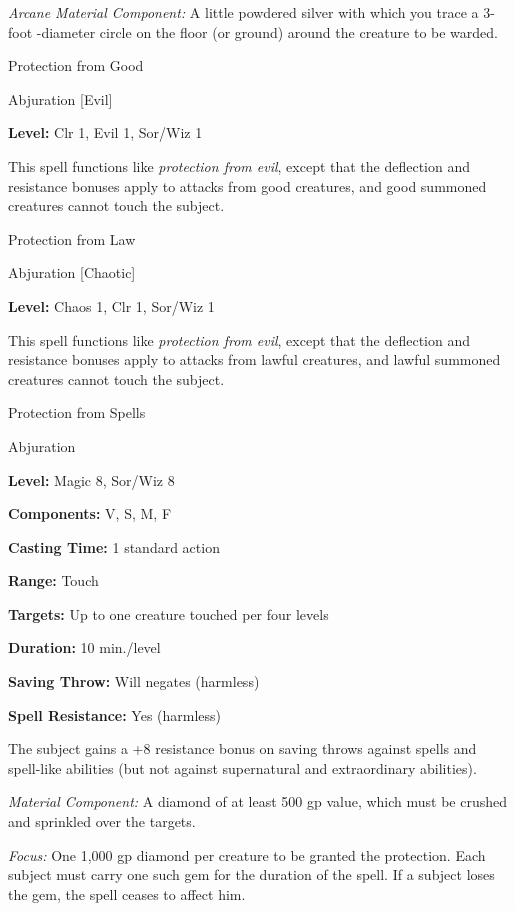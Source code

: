 \documentclass{article}
\begin{document}
\textit{Arcane Material Component: }A little powdered silver with which you trace 
a 3-foot -diameter circle on the floor (or ground) around the creature to be warded.

\vspace{12pt}
Protection from Good

Abjuration [Evil]

\textbf{Level:} Clr 1, Evil 1, Sor/Wiz 1

This spell functions like \textit{protection from evil}, except that the deflection 
and resistance bonuses apply to attacks from good creatures, and good summoned 
creatures cannot touch the subject.

\vspace{12pt}
Protection from Law

Abjuration [Chaotic]

\textbf{Level:} Chaos 1, Clr 1, Sor/Wiz 1

This spell functions like \textit{protection from evil}, except that the deflection 
and resistance bonuses apply to attacks from lawful creatures, and lawful summoned 
creatures cannot touch the subject.

\vspace{12pt}
Protection from Spells

Abjuration

\textbf{Level: }Magic 8, Sor/Wiz 8

\textbf{Components:} V, S, M, F

\textbf{Casting Time:} 1 standard action

\textbf{Range:} Touch

\textbf{Targets:} Up to one creature touched per four levels

\textbf{Duration:} 10 min./level

\textbf{Saving Throw: }Will negates (harmless)

\textbf{Spell Resistance:} Yes (harmless)

The subject gains a +8 resistance bonus on saving throws against spells and spell-like 
abilities (but not against supernatural and extraordinary abilities).

\textit{Material Component: }A diamond of at least 500 gp value, which must be 
crushed and sprinkled over the targets.

\textit{Focus: }One 1,000 gp diamond per creature to be granted the protection. 
Each subject must carry one such gem for the duration of the spell. If a subject 
loses the gem, the spell ceases to affect him.
\end{document}
